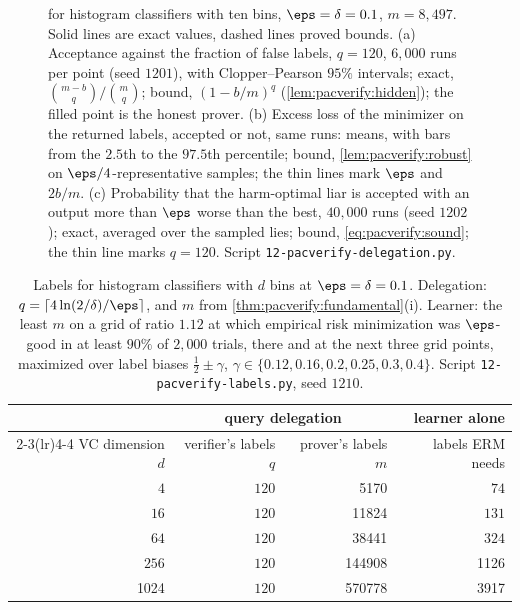 \begin{refsection}
\begin{figure}[t]
\begin{fullwidth}
\begin{tikzpicture}
\end{tikzpicture}
\end{fullwidth}
\caption{ for histogram classifiers with ten bins, $\eps=\delta=0.1$, $m=8{,}497$. Solid lines are exact values, dashed lines proved bounds. (a) Acceptance against the fraction of false labels, $q=120$, $6{,}000$ runs per point (seed $1201$), with Clopper--Pearson $95\%$ intervals; exact, $\binom{m-b}{q}/\binom mq$; bound, $(1-b/m)^q$ (\cref{lem:pacverify:hidden}); the filled point is the honest prover. (b) Excess loss of the minimizer on the returned labels, accepted or not, same runs: means, with bars from the $2.5$th to the $97.5$th percentile; bound, \cref{lem:pacverify:robust} on $\eps/4$-representative samples; the thin lines mark $\eps$ and $2b/m$. (c) Probability that the harm-optimal liar is accepted with an output more than $\eps$ worse than the best, $40{,}000$ runs (seed $1202$); exact, averaged over the sampled lies; bound, \eqref{eq:pacverify:sound}; the thin line marks $q=120$. Script \texttt{12-pacverify-delegation.py}.}\label{fig:pacverify:runs}
\end{figure}

\begin{table}[b]
\centering\small
\begin{tabular}{@{}r r r r@{}}
\toprule
& \multicolumn{2}{c}{query delegation} & learner alone\\
\cmidrule(lr){2-3}\cmidrule(lr){4-4}
VC dimension $d$ & verifier's labels $q$ & prover's labels $m$ & labels ERM needs\\
\midrule
$4$ & $120$ & \num{5170} & $74$\\
$16$ & $120$ & \num{11824} & $131$\\
$64$ & $120$ & \num{38441} & $324$\\
$256$ & $120$ & \num{144908} & \num{1126}\\
\num{1024} & $120$ & \num{570778} & \num{3917}\\
\bottomrule
\end{tabular}
\caption{Labels for histogram classifiers with $d$ bins at $\eps=\delta=0.1$. Delegation: $q=\lceil4\ln(2/\delta)/\eps\rceil$, and $m$ from \cref{thm:pacverify:fundamental}(i). Learner: the least $m$ on a grid of ratio $1.12$ at which empirical risk minimization was $\eps$-good in at least $90\%$ of $2{,}000$ trials, there and at the next three grid points, maximized over label biases $\frac12\pm\gamma$, $\gamma\in\{0.12,0.16,0.2,0.25,0.3,0.4\}$. Script \texttt{12-pacverify-labels.py}, seed $1210$.}\label{tab:pacverify:labels}
\end{table}


\end{refsection}
